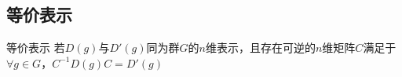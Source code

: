
\begin{issues}
\issueDraft
\end{issues}

\subsection{等价表示}
\begin{definition}{等价表示}
若$D(g)$与$D'(g)$同为群$G$的$n$维表示，且存在可逆的$n$维矩阵$C$满足于$\forall g\in G$，$C^{-1}D(g)C=D'(g)$
\end{definition}